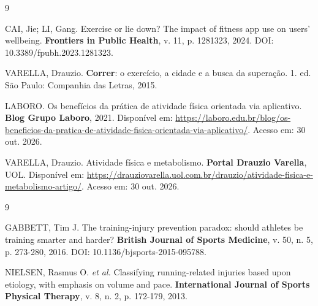 \documentclass[12pt,a4paper]{article}
\begin{document}
\renewcommand{\refname}{Pesquisa (Sprint 1)}
\begin{thebibliography}{9}

CAI, Jie; LI, Gang. Exercise or lie down? The impact of fitness app use on users'
wellbeing. \textbf{Frontiers in Public Health}, v. 11, p. 1281323, 2024.
DOI: 10.3389/fpubh.2023.1281323.

VARELLA, Drauzio. \textbf{Correr}: o exercício, a cidade e a busca da superação.
1. ed. São Paulo: Companhia das Letras, 2015.

LABORO. Os benefícios da prática de atividade física orientada via aplicativo.
\textbf{Blog Grupo Laboro}, 2021. Disponível em:
\url{https://laboro.edu.br/blog/os-beneficios-da-pratica-de-atividade-fisica-orientada-via-aplicativo/}.
Acesso em: 30 out. 2026.

VARELLA, Drauzio. Atividade física e metabolismo. \textbf{Portal Drauzio Varella},
UOL. Disponível em:
\url{https://drauziovarella.uol.com.br/drauzio/atividade-fisica-e-metabolismo-artigo/}.
Acesso em: 30 out. 2026.

\end{thebibliography}

\renewcommand{\refname}{História de usuário 3}
\begin{thebibliography}{9}
\setcounter{enumiv}{4}

GABBETT, Tim J. The training-injury prevention paradox: should athletes be training
smarter and harder? \textbf{British Journal of Sports Medicine}, v. 50, n. 5,
p. 273-280, 2016. DOI: 10.1136/bjsports-2015-095788.

NIELSEN, Rasmus O. \textit{et al.} Classifying running-related injuries based upon
etiology, with emphasis on volume and pace. \textbf{International Journal of Sports
Physical Therapy}, v. 8, n. 2, p. 172-179, 2013.

\end{thebibliography}
\end{document}
